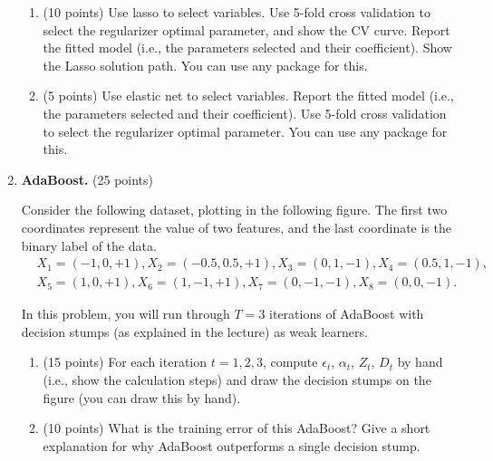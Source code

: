 \documentclass[twoside,10pt]{article}
\begin{document}
\begin{enumerate}
\begin{enumerate}
\item (10 points) Use lasso to select variables. Use 5-fold cross validation to select the regularizer optimal parameter, and show the CV curve.  Report the fitted model (i.e., the parameters selected and their coefficient). Show the Lasso solution path. You can use any package for this. 

\item (5 points) Use elastic net to select variables. Report the fitted model (i.e., the parameters selected and their coefficient). Use  5-fold  cross validation to select the regularizer optimal parameter. You can use any package for this.

\end{enumerate}

\clearpage


\item  {\bf AdaBoost.} (25 points)

Consider the following dataset, plotting in the following figure. The first two coordinates represent the value of two features, and the last coordinate is the binary label of the data.
\begin{equation*}
\begin{split}
&X_1 = (-1, 0, +1), X_2 = (-0.5, 0.5, +1), X_3 = (0, 1, -1), X_4 = (0.5, 1, -1), \\
&X_5 = (1, 0, +1), X_6 = (1, -1, +1), X_7 = (0, -1, -1), X_8 = (0, 0, -1).
\end{split}
\end{equation*}

In this problem, you will run through $T = 3$ iterations of AdaBoost with decision stumps (as explained in the lecture) as weak learners.

\begin{enumerate}
\item (15 points) For each iteration $t = 1, 2, 3$, compute $\epsilon_t$, $\alpha_t$, $Z_t$, $D_t$ by hand (i.e., show the calculation steps) and draw the decision stumps on the figure (you can draw this by hand). 

\item (10 points) What is the training error of this AdaBoost? Give a short explanation for why AdaBoost outperforms a single decision stump.

\end{enumerate}



\end{enumerate}
\end{document}

